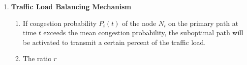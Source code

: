 \begin{enumerate}
\item \textbf{Traffic Load Balancing Mechanism}
	\begin{enumerate}
	\item If congestion probability $P_{i}(t)$ of the node $N_{i}$ on the primary path at time $t$ exceeds the mean congestion probability, the suboptimal path will be activated to transmit a certain percent of the traffic load.
	\item The ratio $r$ 
	\end{enumerate}

	
\end{enumerate}















